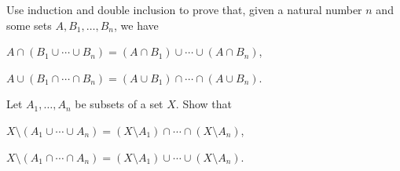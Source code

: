 \begin{exercises}
\item Use induction and double inclusion to prove that, given a natural number $n$ and some sets $A, B_1,\ldots,B_n$, we have
\begin{lettered}
\item $A \cap (B_1 \cup \cdots \cup B_n) = (A\cap B_1) \cup \cdots \cup (A \cap B_n)$,
\item $A \cup (B_1 \cap \cdots \cap B_n) = (A\cup B_1) \cap \cdots \cap (A \cup B_n)$.
\end{lettered}
Let $A_1,\ldots,A_n$ be subsets of a set $X$. Show that
\begin{lettered}[resume]
\item $X \setminus (A_1 \cup \cdots \cup A_n) = (X \setminus A_1) \cap \cdots \cap (X \setminus A_n)$,
\item $X \setminus (A_1 \cap \cdots \cap A_n) = (X \setminus A_1) \cup \cdots \cup (X \setminus A_n)$.
\end{lettered}
\end{exercises}
